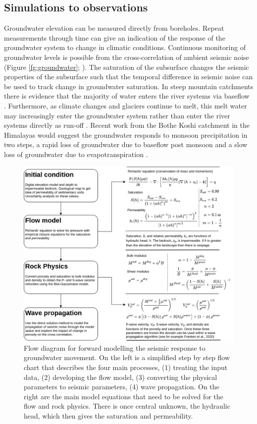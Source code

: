 \subsection{Simulations to observations}

Groundwater elevation can be measured directly from boreholes. Repeat measurements through time can give an indication of the response of the groundwater system to change in climatic conditions. Continuous monitoring of groundwater levels is possible from the cross-correlation of ambient seismic noise (Figure \ref{fg:groundwater}; \citealp{lecocq-etal-2017,clements-2018}). The saturation of the subsurface changes the seismic properties of the subsurface such that the temporal difference in seismic noise can be used to track change in groundwater saturation. In steep mountain catchments there is evidence that the majority of water enters the river systems via baseflow \citep{jasechko-etal-2016}. Furthermore, as climate changes and glaciers continue to melt, this melt water may increasingly enter the groundwater system rather than enter the river systems directly as run-off \citep{vincent-etal-2019}. Recent work from the Bothe Koshi catchment in the Himalayas would suggest the groundwater responds to monsoon precipitation in two steps, a rapid loss of groundwater due to baseflow post monsoon and a slow loss of groundwater due to evapotranspiration \citep{illien-etal-2020}.

\begin{figure}
    \centering
    \includegraphics[width=\textwidth]{./figures/groundwater-flowchart.png}
    \caption{Flow diagram for forward modelling the seismic response to groundwater movement. On the left is a simplified step by step flow chart that describes the four main processes, (1) treating the input data, (2) developing the flow model, (3) converting the physical parameters to seismic parameters, (4) wave propagation. On the right are the main model equations that need to be solved for the flow and rock physics. There is once central unknown, the hydraulic head, which then gives the saturation and permeability.}
    \label{fg:groundwater-flowchart}
\end{figure}

